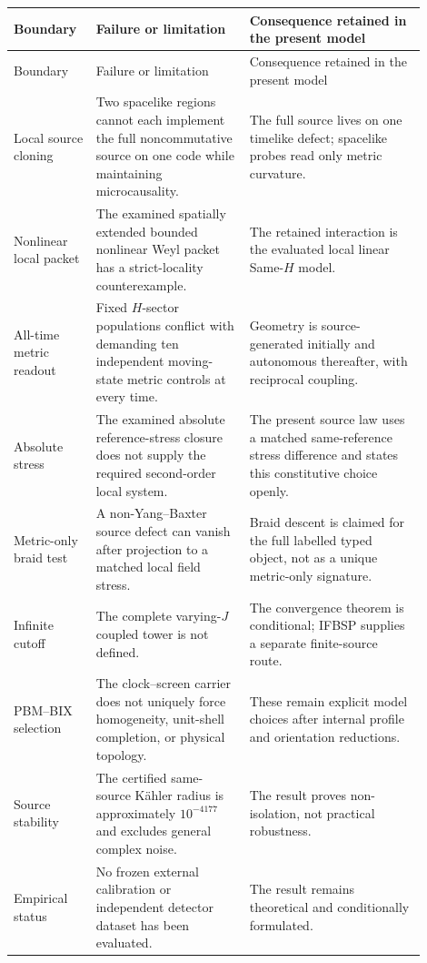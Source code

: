 \documentclass[11pt]{article}
\theoremstyle{definition}
\theoremstyle{remark}
\begin{document}
\begin{longtable}{>{\raggedright\arraybackslash}p{0.17\linewidth}>{\raggedright\arraybackslash}p{0.34\linewidth}>{\raggedright\arraybackslash}p{0.39\linewidth}}
\toprule
Boundary & Failure or limitation & Consequence retained in the present model\\
\midrule
\endfirsthead
\toprule
Boundary & Failure or limitation & Consequence retained in the present model\\
\midrule
\endhead
Local source cloning & Two spacelike regions cannot each implement the full noncommutative source on one code while maintaining microcausality. & The full source lives on one timelike defect; spacelike probes read only metric curvature.\\
Nonlinear local packet & The examined spatially extended bounded nonlinear Weyl packet has a strict-locality counterexample. & The retained interaction is the evaluated local linear Same-$H$ model.\\
All-time metric readout & Fixed $H$-sector populations conflict with demanding ten independent moving-state metric controls at every time. & Geometry is source-generated initially and autonomous thereafter, with reciprocal coupling.\\
Absolute stress & The examined absolute reference-stress closure does not supply the required second-order local system. & The present source law uses a matched same-reference stress difference and states this constitutive choice openly.\\
Metric-only braid test & A non-Yang--Baxter source defect can vanish after projection to a matched local field stress. & Braid descent is claimed for the full labelled typed object, not as a unique metric-only signature.\\
Infinite cutoff & The complete varying-$J$ coupled tower is not defined. & The convergence theorem is conditional; IFBSP supplies a separate finite-source route.\\
PBM--BIX selection & The clock--screen carrier does not uniquely force homogeneity, unit-shell completion, or physical topology. & These remain explicit model choices after internal profile and orientation reductions.\\
Source stability & The certified same-source K\"ahler radius is approximately $10^{-4177}$ and excludes general complex noise. & The result proves non-isolation, not practical robustness.\\
Empirical status & No frozen external calibration or independent detector dataset has been evaluated. & The result remains theoretical and conditionally formulated.\\
\bottomrule
\end{longtable}
\end{document}
